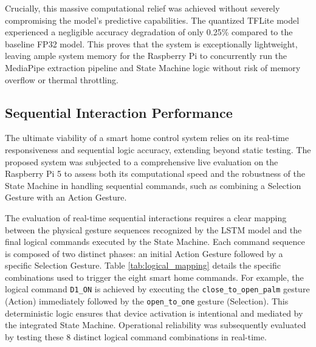 Crucially, this massive computational relief was achieved without severely compromising the model's predictive capabilities. The quantized TFLite model experienced a negligible accuracy degradation of only 0.25\% compared to the baseline FP32 model. This proves that the system is exceptionally lightweight, leaving ample system memory for the Raspberry Pi to concurrently run the MediaPipe extraction pipeline and State Machine logic without risk of memory overflow or thermal throttling.


\subsection{Sequential Interaction Performance}

The ultimate viability of a smart home control system relies on its real-time responsiveness and sequential logic accuracy, extending beyond static testing. The proposed system was subjected to a comprehensive live evaluation on the Raspberry Pi 5 to assess both its computational speed and the robustness of the State Machine in handling sequential commands, such as combining a Selection Gesture with an Action Gesture.

The evaluation of real-time sequential interactions requires a clear mapping between the physical gesture sequences recognized by the LSTM model and the final logical commands executed by the State Machine. Each command sequence is composed of two distinct phases: an initial Action Gesture followed by a specific Selection Gesture. Table \ref{tab:logical_mapping} details the specific combinations used to trigger the eight smart home commands. For example, the logical command \texttt{D1\_ON} is achieved by executing the \texttt{close\_to\_open\_palm} gesture (Action) immediately followed by the \texttt{open\_to\_one} gesture (Selection). This deterministic logic ensures that device activation is intentional and mediated by the integrated State Machine. Operational reliability was subsequently evaluated by testing these 8 distinct logical command combinations in real-time.

